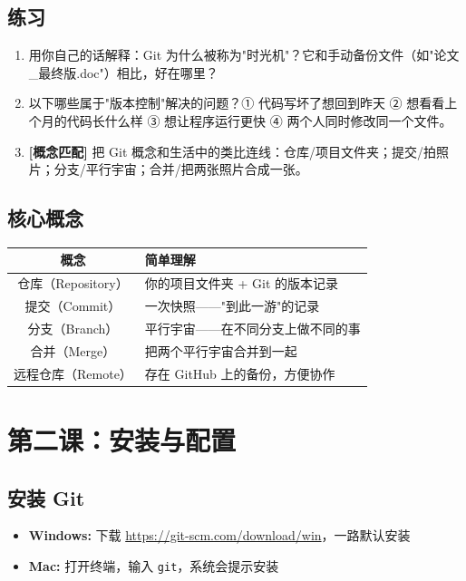 \documentclass[a4paper,12pt]{ctexart}
\begin{document}
\subsection*{练习}

\begin{enumerate}
  \item 用你自己的话解释：Git 为什么被称为"时光机"？它和手动备份文件（如"论文\_最终版.doc"）相比，好在哪里？
  \item 以下哪些属于"版本控制"解决的问题？① 代码写坏了想回到昨天 ② 想看看上个月的代码长什么样 ③ 想让程序运行更快 ④ 两个人同时修改同一个文件。
  \item \textbf{[概念匹配]} 把 Git 概念和生活中的类比连线：仓库/项目文件夹；提交/拍照片；分支/平行宇宙；合并/把两张照片合成一张。
\end{enumerate}

\subsection*{核心概念}

\begin{center}
\begin{tabular}{|c|l|}
\hline
\textbf{概念} & \textbf{简单理解} \\ \hline
仓库（Repository） & 你的项目文件夹 + Git 的版本记录 \\ \hline
提交（Commit） & 一次快照——"到此一游"的记录 \\ \hline
分支（Branch） & 平行宇宙——在不同分支上做不同的事 \\ \hline
合并（Merge） & 把两个平行宇宙合并到一起 \\ \hline
远程仓库（Remote） & 存在 GitHub 上的备份，方便协作 \\ \hline
\end{tabular}
\end{center}

\section*{第二课：安装与配置}

\subsection*{安装 Git}

\begin{itemize}
  \item \textbf{Windows:} 下载 \url{https://git-scm.com/download/win}，一路默认安装
  \item \textbf{Mac:} 打开终端，输入 \texttt{git}，系统会提示安装
\end{itemize}
\end{document}
